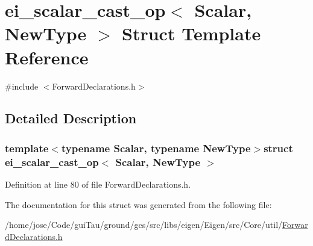 \hypertarget{structei__scalar__cast__op}{\section{ei\-\_\-scalar\-\_\-cast\-\_\-op$<$ Scalar, New\-Type $>$ Struct Template Reference}
\label{structei__scalar__cast__op}
}


{\ttfamily \#include $<$Forward\-Declarations.\-h$>$}



\subsection{Detailed Description}
\subsubsection*{template$<$typename Scalar, typename New\-Type$>$struct ei\-\_\-scalar\-\_\-cast\-\_\-op$<$ Scalar, New\-Type $>$}



Definition at line 80 of file Forward\-Declarations.\-h.



The documentation for this struct was generated from the following file\-:\begin{DoxyCompactItemize}
\item 
/home/jose/\-Code/gui\-Tau/ground/gcs/src/libs/eigen/\-Eigen/src/\-Core/util/\hyperlink{_forward_declarations_8h}{Forward\-Declarations.\-h}\end{DoxyCompactItemize}
